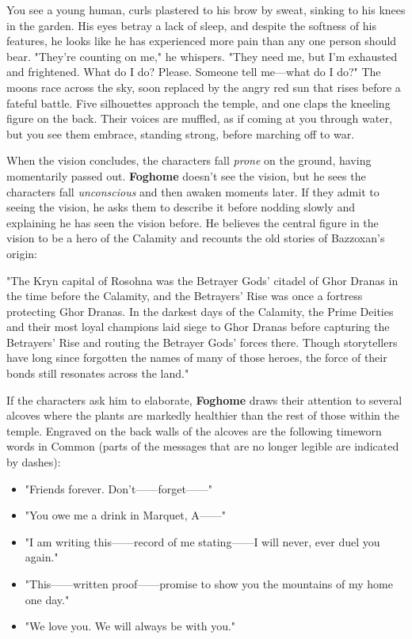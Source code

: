 \documentclass[a4paper, 11pt, bg=full, twocolumn, nooutline]{dndbook}
\begin{document}
\begin{DndReadAloud}
You see a young human, curls plastered to his brow by sweat, sinking to his knees in the garden. His eyes betray a lack of sleep, and despite the softness of his features, he looks like he has experienced more pain than any one person should bear. "They're counting on me," he whispers. "They need me, but I'm exhausted and frightened. What do I do? Please. Someone tell me---what do I do?"
The moons race across the sky, soon replaced by the angry red sun that rises before a fateful battle. Five silhouettes approach the temple, and one claps the kneeling figure on the back. Their voices are muffled, as if coming at you through water, but you see them embrace, standing strong, before marching off to war.
\end{DndReadAloud}

When the vision concludes, the characters fall \textit{prone} on the ground, having momentarily passed out. \textbf{Foghome} doesn't see the vision, but he sees the characters fall \textit{unconscious} and then awaken moments later. If they admit to seeing the vision, he asks them to describe it before nodding slowly and explaining he has seen the vision before. He believes the central figure in the vision to be a hero of the Calamity and recounts the old stories of Bazzoxan's origin:

\begin{DndReadAloud}
"The Kryn capital of Rosohna was the Betrayer Gods' citadel of Ghor Dranas in the time before the Calamity, and the Betrayers' Rise was once a fortress protecting Ghor Dranas. In the darkest days of the Calamity, the Prime Deities and their most loyal champions laid siege to Ghor Dranas before capturing the Betrayers' Rise and routing the Betrayer Gods' forces there. Though storytellers have long since forgotten the names of many of those heroes, the force of their bonds still resonates across the land."
\end{DndReadAloud}

If the characters ask him to elaborate, \textbf{Foghome} draws their attention to several alcoves where the plants are markedly healthier than the rest of those within the temple. Engraved on the back walls of the alcoves are the following timeworn words in Common (parts of the messages that are no longer legible are indicated by dashes):

\begin{itemize}
\item "Friends forever. Don't------forget------"
\item "You owe me a drink in Marquet, A------"
\item "I am writing this------record of me stating------I will never, ever duel you again."
\item "This------written proof------promise to show you the mountains of my home one day."
\item "We love you. We will always be with you."
\end{itemize}
\end{document}
